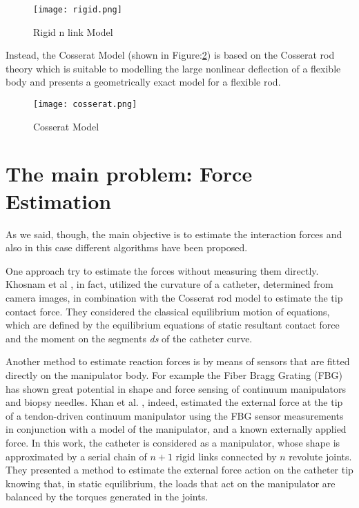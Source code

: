 \documentclass[conference,12pt]{IEEEtran}
\begin{document}
\begin{figure}[htbp]
\centerline{\texttt{[image: rigid.png]}}
\caption{Rigid n link Model}
\label{rigid}
\end{figure}

Instead, the Cosserat Model (shown in Figure:\ref{cosserat}) is based on the Cosserat rod theory which is suitable to modelling the large nonlinear deflection of a flexible body and presents a geometrically exact model for a flexible rod.

\begin{figure}[htbp]
\centerline{\texttt{[image: cosserat.png]}}
\caption{Cosserat Model}
\label{cosserat}
\end{figure}

\section{The main problem: Force Estimation}

As we said, though, the main objective is to estimate the interaction forces and also in this case different algorithms have been proposed.
 
One approach try to estimate the forces without measuring them directly. Khosnam et al \cite{khosnam}, in fact, utilized the curvature of a catheter, determined from camera images, in combination with the Cosserat rod model to estimate the tip contact force. They considered the classical equilibrium motion of equations, which are defined by the equilibrium equations of static resultant contact force and the moment on the segments \textit{ds} of the catheter curve.

Another method to estimate reaction forces is by means of sensors that are fitted directly on the manipulator body. For example the Fiber Bragg Grating (FBG) has shown great potential in shape and force sensing of continuum manipulators and biopsy needles. Khan et al. \cite{khan}, indeed,  estimated the external force at the tip of a tendon-driven continuum manipulator using the FBG sensor measurements in conjunction with a model of the manipulator, and a known externally applied force. In this work, the catheter is considered as a manipulator, whose shape is approximated by a serial chain of $n+1$ rigid links connected by $n$ revolute joints. They presented a method to estimate the external force action on the catheter tip knowing that, in static equilibrium, the loads that act on the manipulator are balanced by the torques generated in the joints.
\end{document}
